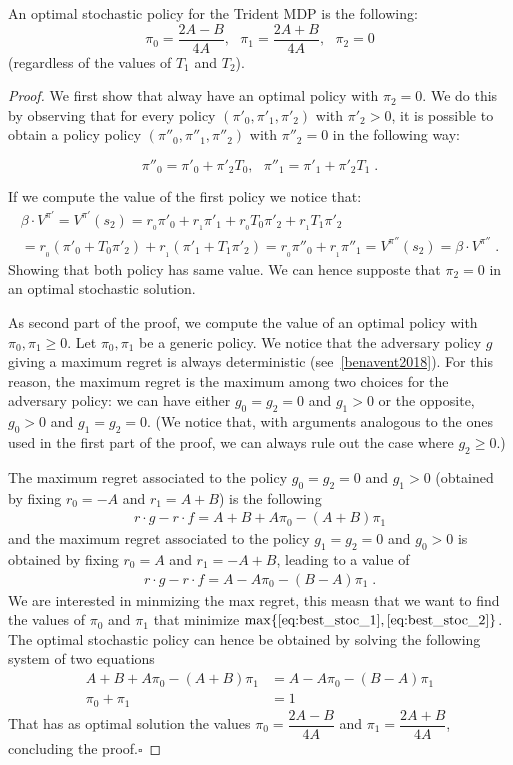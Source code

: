 \begin{proposition}\label{theorem:opt_stoc}
An optimal stochastic policy  for the Trident MDP is the following:
$$\pi_{0}=\dfrac{2A - B}{4A},~~~\pi_{1}=\dfrac{2A + B}{4A}, ~~~\pi_2 = 0$$
(regardless of the values of $T_1$ and $T_2$).
\end{proposition}
\begin{proof}
We first show that alway have an optimal policy with $\pi_2 = 0$. We do this by observing that for every policy $(\pi'_0, \pi'_1, \pi'_2)$ with $\pi'_2 > 0$, it is possible to obtain a policy policy $(\pi''_0, \pi''_1, \pi''_2)$ with $\pi''_2 = 0$ in the following way:

$$\pi''_0 = \pi'_0 + \pi'_2 T_0, ~~~ \pi''_1 = \pi'_1 + \pi'_2 T_1\;.$$

If we compute the value of the first policy we notice that:
\begin{align*}
\beta \cdot V^{\pi'} = V^{\pi'}(s_2) =
r_{_0} \pi'_0 + r_{_1}\pi'_1 + r_{_0} T_0 \pi'_2 + r_{_1} T_1 \pi'_2 \\
= r_{_0} (\pi'_0 + T_0 \pi'_2) + r_{_1} (\pi'_1 + T_1 \pi'_2)
= r_{_0} \pi''_0 + r_{_1}\pi''_1 = V^{\pi''}(s_2) =\beta \cdot V^{\pi''}\;.
\end{align*}
Showing that both policy has same value. We can hence supposte that $\pi_2 =0$ in an optimal stochastic solution.

As second part of the proof, we compute the value of an optimal policy with $\pi_0, \pi_1 \geq 0$.
Let $\pi_0,\pi_1$ be a generic policy. We notice that the adversary policy $g$ giving a maximum regret  is always deterministic (see~\ref{benavent2018}). For this reason, the maximum regret is the maximum among two choices for the adversary policy: we can have either $g_0=g_2=0$ and $g_1 > 0$ or the opposite, $g_0>0$ and $g_1=g_2 = 0$. (We notice that, with arguments analogous to the ones used in the first part of the proof, we can always rule out the case where $g_2 \geq 0$.)

The maximum regret associated to the policy $g_0=g_2=0$ and $g_1 > 0$  (obtained by fixing $r_0 = -A$ and $r_1 = A+B$) is the following
\begin{align}
r \cdot g - r \cdot f = A + B +A \pi_0 -(A+B)\pi_1 \label{eq:best_stoc_1}
\end{align}   
and the maximum regret associated to the policy $g_1=g_2=0$ and $g_0 > 0$ is obtained by fixing $r_0 = A$ and $r_1 = -A+B$, leading to a value of
\begin{align}
r \cdot g - r \cdot f = A - A \pi_0 -(B-A)\pi_1 \label{eq:best_stoc_2}\;.
\end{align}   
We are interested in minmizing the max regret, this measn that we want to find the values of $\pi_0$ and $\pi_1$ that minimize $\max \{\eqref{eq:best_stoc_1}, \eqref{eq:best_stoc_2}\}$. The optimal stochastic policy can hence be obtained by solving the following system of two equations 
\begin{align*}
A + B +A \pi_0 -(A+B)\pi_1 &= A - A \pi_0 -(B-A)\pi_1\\
\pi_0+\pi_1 &= 1
\end{align*} 
That has as optimal solution the values $\pi_{0}=\dfrac{2A - B}{4A}$ and $\pi_{1}=\dfrac{2A + B}{4A}$, concluding the proof.$\square$
\end{proof}
